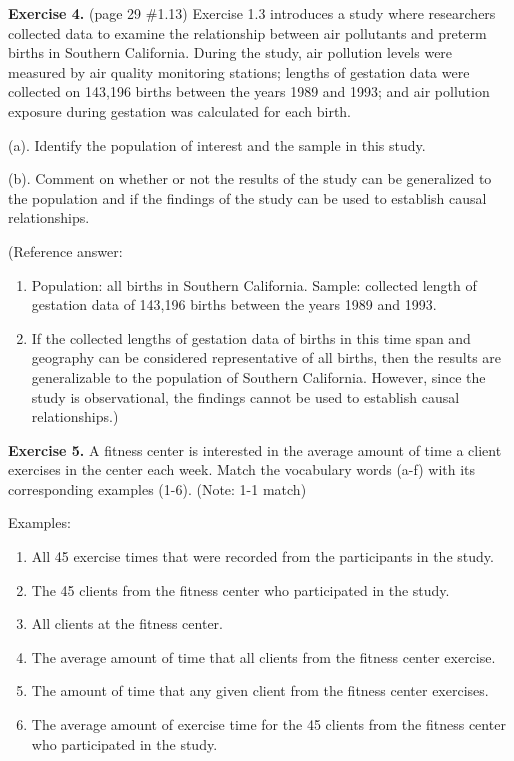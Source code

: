 \documentclass[
]{book}
\begin{document}
\textbf{Exercise 4.} (page 29 \#1.13) Exercise 1.3 introduces a study where researchers collected data to examine the relationship between air pollutants and preterm births in Southern California. During the study, air pollution levels were measured by air quality monitoring stations; lengths of gestation data were collected on 143,196 births between the years 1989 and 1993; and air pollution exposure during gestation was calculated for each birth.

(a). Identify the population of interest and the sample in this study.

(b). Comment on whether or not the results of the study can be generalized to the population and if the findings of the study can be used to establish causal relationships.

(Reference answer:

\begin{enumerate}
\def\labelenumi{(\alph{enumi})}
\item
  Population: all births in Southern California. Sample: collected length of gestation data of 143,196 births between the years 1989 and 1993.
\item
  If the collected lengths of gestation data of births in this time span and geography can be considered representative of all births, then the results are generalizable to the population of Southern California. However, since the study is observational, the findings cannot be used to establish causal relationships.)
\end{enumerate}

\textbf{Exercise 5.} A fitness center is interested in the average amount of time a client exercises in the center each week. Match the vocabulary words (a-f) with its corresponding examples (1-6). (Note: 1-1 match)

Examples:

\begin{enumerate}
\def\labelenumi{\arabic{enumi}.}
\item
  All 45 exercise times that were recorded from the participants in the study.
\item
  The 45 clients from the fitness center who participated in the study.
\item
  All clients at the fitness center.
\item
  The average amount of time that all clients from the fitness center exercise.
\item
  The amount of time that any given client from the fitness center exercises.
\item
  The average amount of exercise time for the 45 clients from the fitness center who participated in the study.
\end{enumerate}
\end{document}
